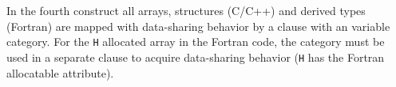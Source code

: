In the fourth  construct all arrays, structures (C/C++) and derived 
types (Fortran) are mapped with  data-sharing behavior by a 
 clause with an  variable category.
For the \texttt{H} allocated array in the Fortran code, the  
category must be used in a separate  clause to acquire 
 data-sharing behavior (\texttt{H} has the Fortran allocatable attribute).


